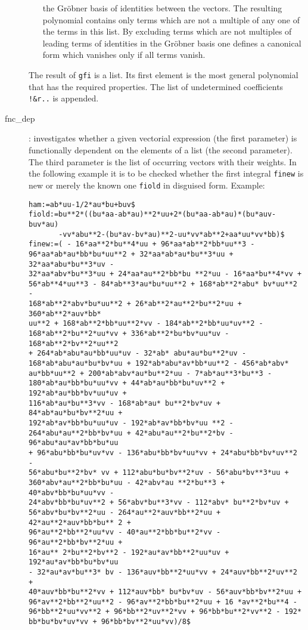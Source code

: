 \documentclass[12pt]{article}
\begin{document}
\begin{description}
\begin{enumerate}
                the Gr\"{o}bner basis of identities between the
                vectors. The resulting polynomial contains only terms
                which are not a multiple of any one of the terms in
                this list. By excluding terms which are not multiples
                of leading terms of identities in the Gr\"{o}bner
                basis one defines a canonical form which vanishes
                only if all terms vanish.  
         \end{enumerate}
     The result of {\tt gfi} is a list. 
     Its first element is the most general polynomial that has the required
     properties. The list of undetermined coefficients
     {\tt !\&r..} is appended.
  \item[fnc\_dep] : investigates whether a given
     vectorial expression (the first parameter) is
     functionally dependent on the elements of a list (the
     second parameter). The third parameter is the list of
     occurring vectors with their weights. In the following example it is to be
     checked whether the first integral {\tt finew} is new or merely the known
     one {\tt fiold} in disguised form. Example: \begin{verbatim} 
ham:=ab*uu-1/2*au*bu+buv$ 
fiold:=bu**2*((bu*aa-ab*au)**2*uu+2*(bu*aa-ab*au)*(bu*auv-buv*au)
       -vv*abu**2-(bu*av-bv*au)**2-uu*vv*ab**2+aa*uu*vv*bb)$
finew:=( - 16*aa**2*bu**4*uu + 96*aa*ab**2*bb*uu**3 -
96*aa*ab*au*bb*bu*uu**2 + 32*aa*ab*au*bu**3*uu + 32*aa*abu*bu**3*uv -
32*aa*abv*bu**3*uu + 24*aa*au**2*bb*bu **2*uu - 16*aa*bu**4*vv +
56*ab**4*uu**3 - 84*ab**3*au*bu*uu**2 + 168*ab**2*abu* bv*uu**2 -
168*ab**2*abv*bu*uu**2 + 26*ab**2*au**2*bu**2*uu + 360*ab**2*auv*bb*
uu**2 + 168*ab**2*bb*uu**2*vv - 184*ab**2*bb*uu*uv**2 -
168*ab**2*bu**2*uu*vv + 336*ab**2*bu*bv*uu*uv - 168*ab**2*bv**2*uu**2
+ 264*ab*abu*au*bb*uu*uv - 32*ab* abu*au*bu**2*uv -
168*ab*abu*au*bu*bv*uu + 192*ab*abu*av*bb*uu**2 - 456*ab*abv*
au*bb*uu**2 + 200*ab*abv*au*bu**2*uu - 7*ab*au**3*bu**3 -
180*ab*au*bb*bu*uu*vv + 44*ab*au*bb*bu*uv**2 + 192*ab*au*bb*bv*uu*uv +
116*ab*au*bu**3*vv - 168*ab*au* bu**2*bv*uv + 84*ab*au*bu*bv**2*uu +
192*ab*av*bb*bu*uu*uv - 192*ab*av*bb*bv*uu **2 -
264*abu*au**2*bb*bv*uu + 42*abu*au**2*bu**2*bv - 96*abu*au*av*bb*bu*uu
+ 96*abu*bb*bu*uv*vv - 136*abu*bb*bv*uu*vv + 24*abu*bb*bv*uv**2 -
56*abu*bu**2*bv* vv + 112*abu*bu*bv**2*uv - 56*abu*bv**3*uu +
360*abv*au**2*bb*bu*uu - 42*abv*au **2*bu**3 + 40*abv*bb*bu*uu*vv -
24*abv*bb*bu*uv**2 + 56*abv*bu**3*vv - 112*abv* bu**2*bv*uv +
56*abv*bu*bv**2*uu - 264*au**2*auv*bb**2*uu + 42*au**2*auv*bb*bu** 2 +
96*au**2*bb**2*uu*vv - 40*au**2*bb*bu**2*vv - 96*au**2*bb*bv**2*uu +
16*au** 2*bu**2*bv**2 - 192*au*av*bb**2*uu*uv + 192*au*av*bb*bu*bv*uu
- 32*au*av*bu**3* bv - 136*auv*bb**2*uu*vv + 24*auv*bb**2*uv**2 +
40*auv*bb*bu**2*vv + 112*auv*bb* bu*bv*uv - 56*auv*bb*bv**2*uu +
96*av**2*bb**2*uu**2 - 96*av**2*bb*bu**2*uu + 16 *av**2*bu**4 -
96*bb**2*uu*vv**2 + 96*bb**2*uv**2*vv + 96*bb*bu**2*vv**2 - 192*
bb*bu*bv*uv*vv + 96*bb*bv**2*uu*vv)/8$


\end{verbatim}
\end{description}
\end{document}
